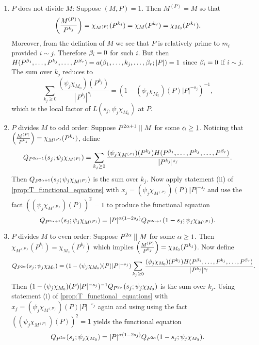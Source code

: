 \documentclass[12pt,reqno,oneside]{amsart}
\begin{document}
    \begin{enumerate}[label=(\roman*)]
        \item $P$ does not divide $M$: Suppose $(M,P) = 1$. Then $M^{(P)} = M$ so that 
        \[
            \left(\frac{M^{(P)}}{P^{k_{j}}}\right) = \chi_{M^{(P)}}(P^{k_{j}}) = \chi_{M}(P^{k_{j}}) = \chi_{M_{0}}(P^{k_{j}}).
        \]
        Moreover, from the defintion of $M$ we see that $P$ is relatively prime to $m_{i}$ provided $i \sim j$. Therefore $\beta_{i} = 0$ for such $i$. But then $H(P^{\beta_{1}},\ldots,P^{k_{j}},\ldots,P^{\beta_{r}}) = a(\beta_{1},\ldots,k_{j},\ldots,\beta_{r};|P|) = 1$ since $\beta_{i} = 0$ if $i \sim j$. The sum over $k_{j}$ reduces to
        \[
            \sum_{k_{j} \ge 0}\frac{(\psi_{j}\chi_{M_{0}})(P^{k_{j}})}{|P^{k_{j}}|^{s_{j}}} = (1-(\psi_{j}\chi_{M_{0}})(P)|P|^{-s_{j}})^{-1},
        \]
        which is the local factor of $L(s_{j},\psi_{j}\chi_{M_{0}})$ at $P$.
        \item $P$ divides $M$ to odd order: Suppose $P^{2\alpha+1} \mid\mid M$ for some $\alpha \ge 1$. Noticing that $\textstyle{\left(\frac{M^{(P)}}{P^{k_{j}}}\right)} = \chi_{M^{(P)}}(P^{k_{j}})$, define 
        \[
            Q_{P^{2\alpha+1}}(s_{j};\psi_{j}\chi_{M^{(P)}}) = \sum_{k_{j} \ge 0}\frac{(\psi_{j}\chi_{M^{(P)}})(P^{k_{j}})H(P^{\beta_{1}},\ldots,P^{k_{j}},\ldots,P^{\beta_{r}})}{|P^{k_{j}}|^{s_{j}}}.
        \]
        Then $Q_{P^{2\alpha+1}}(s_{j};\psi_{j}\chi_{M^{(P)}})$ is the sum over $k_{j}$. Now apply statement (ii) of \cref{prop:T_functional_equations} with $x_{j} = (\psi_{j}\chi_{M^{(P)}})(P)|P|^{-s_{j}}$ and use the fact $((\psi_{j}\chi_{M^{(P)}})(P))^{2} = 1$ to produce the functional equation
        \[
            Q_{P^{2\alpha+1}}(s_{j};\psi_{j}\chi_{M^{(P)}}) = |P|^{\alpha(1-2s_{j})}Q_{P^{2\alpha+1}}(1-s_{j};\psi_{j}\chi_{M^{(P)}}).
        \]
        \item $P$ divides $M$ to even order: Suppose $P^{2\alpha} \mid\mid M$ for some $\alpha \ge 1$. Then $\chi_{M^{(P)}}(P^{k_{j}}) = \chi_{M_{0}}(P^{k_{j}})$ which implies $\textstyle{\left(\frac{M^{(P)}}{P^{k_{j}}}\right)} = \chi_{M_{0}}(P^{k_{j}})$. Now define
        \[
            Q_{P^{2\alpha}}(s_{j};\psi_{j}\chi_{M_{0}}) = (1-(\psi_{j}\chi_{M_{0}})(P)|P|^{-s_{j}})\sum_{k_{j} \ge 0}\frac{(\psi_{j}\chi_{M_{0}})(P^{k_{j}})H(P^{\beta_{1}},\ldots,P^{k_{j}},\ldots,P^{\beta_{r}})}{|P^{k_{j}}|^{s_{j}}}.
        \]
        Then $(1-(\psi_{j}\chi_{M_{0}})(P)|P|^{-s_{j}})^{-1}Q_{P^{2\alpha}}(s_{j};\psi_{j}\chi_{M_{0}})$ is the sum over $k_{j}$. Using statement (i) of \cref{prop:T_functional_equations} with $x_{j} = (\psi_{j}\chi_{M^{(P)}})(P)|P|^{-s_{j}}$ again and using using the fact $((\psi_{j}\chi_{M^{(P)}})(P))^{2} = 1$ yields the functional equation
        \[
            Q_{P^{2\alpha}}(s_{j};\psi_{j}\chi_{M_{0}}) = |P|^{\alpha(1-2s_{j})}Q_{P^{2\alpha}}(1-s_{j};\psi_{j}\chi_{M_{0}}).
        \]
    \end{enumerate}
\end{document}
